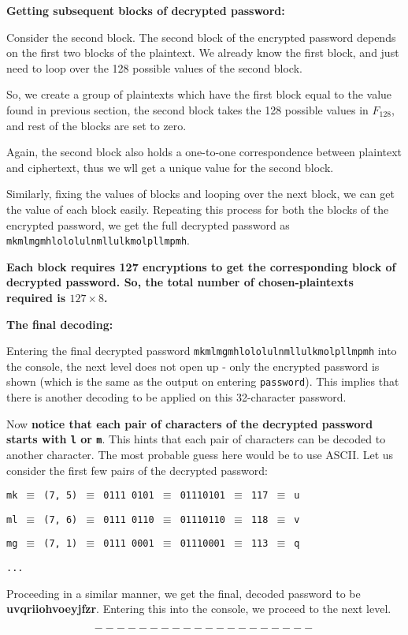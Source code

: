 \documentclass[11pt]{article}
\begin{document}
\textbf{Getting subsequent blocks of decrypted password:}
\medskip

Consider the second block. The second block of the encrypted password depends on the first two blocks of the plaintext. We already know the first block, and just need to loop over the 128 possible values of the second block.
\medskip

So, we create a group of plaintexts which have the first block equal to the value found in previous section, the second block takes the 128 possible values in $F_{128}$, and rest of the blocks are set to zero.
\medskip

Again, the second block also holds a one-to-one correspondence between plaintext and ciphertext, thus we wll get a unique value for the second block.
\medskip

Similarly, fixing the values of blocks and looping over the next block, we can get the value of each block easily. Repeating this process for both the blocks of the encrypted password, we get the full decrypted password as \texttt{mkmlmgmhlololulnmllulkmolpllmpmh}.
\medskip
\bigskip

\textbf{Each block requires 127 encryptions to get the corresponding block of decrypted password. So, the total number of chosen-plaintexts required is $127 \times 8$.}
\medskip
\bigskip
\pagebreak

\textbf{The final decoding: }
\bigskip

Entering the final decrypted password \texttt{mkmlmgmhlololulnmllulkmolpllmpmh} into the console, the next level does not open up - only the encrypted password is shown (which is the same as the output on entering \texttt{password}). This implies that there is another decoding to be applied on this 32-character password.

Now \textbf{notice that each pair of characters of the decrypted password starts with \texttt{l} or \texttt{m}}. This hints that each pair of characters can be decoded to another character. The most probable guess here would be to use ASCII. Let us consider the first few pairs of the decrypted password:

\begin{center}
  \texttt{mk $\equiv$ (7, 5) $\equiv$ 0111 0101 $\equiv$ 01110101 $\equiv$ 117 $\equiv$ u}

  \texttt{ml $\equiv$ (7, 6) $\equiv$ 0111 0110 $\equiv$ 01110110 $\equiv$ 118 $\equiv$ v}

  \texttt{mg $\equiv$ (7, 1) $\equiv$ 0111 0001 $\equiv$ 01110001 $\equiv$ 113 $\equiv$ q}

  \texttt{...}
\end{center}

Proceeding in a similar manner, we get the final, decoded password to be \textbf{uvqriiohvoeyjfzr}. Entering this into the console, we proceed to the next level.

$$--------------------$$
\end{document}
